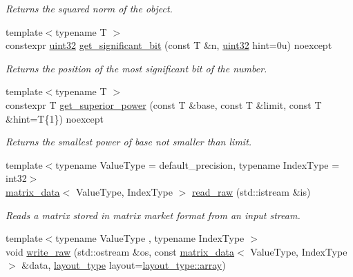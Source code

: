 \begin{DoxyCompactItemize}
\begin{DoxyCompactList}\small\item\em Returns the squared norm of the object. \end{DoxyCompactList}\item 
{\footnotesize template$<$typename T $>$ }\\constexpr \hyperlink{namespacegko_a318c831e3fe269ba04c6ed8bf5a71073}{uint32} \hyperlink{namespacegko_a4eea40e4123a3fdb60fcd92f902c6d6d}{get\+\_\+significant\+\_\+bit} (const T \&n, \hyperlink{namespacegko_a318c831e3fe269ba04c6ed8bf5a71073}{uint32} hint=0u) noexcept
\begin{DoxyCompactList}\small\item\em Returns the position of the most significant bit of the number. \end{DoxyCompactList}\item 
{\footnotesize template$<$typename T $>$ }\\constexpr T \hyperlink{namespacegko_ad39645fe8148a8a812a9528865a77600}{get\+\_\+superior\+\_\+power} (const T \&base, const T \&limit, const T \&hint=T\{1\}) noexcept
\begin{DoxyCompactList}\small\item\em Returns the smallest power of {\ttfamily base} not smaller than {\ttfamily limit}. \end{DoxyCompactList}\item 
{\footnotesize template$<$typename Value\+Type  = default\+\_\+precision, typename Index\+Type  = int32$>$ }\\\hyperlink{structgko_1_1matrix__data}{matrix\+\_\+data}$<$ Value\+Type, Index\+Type $>$ \hyperlink{namespacegko_a0b476e0e3df616b08efe85000bff8da0}{read\+\_\+raw} (std\+::istream \&is)
\begin{DoxyCompactList}\small\item\em Reads a matrix stored in matrix market format from an input stream. \end{DoxyCompactList}\item 
{\footnotesize template$<$typename Value\+Type , typename Index\+Type $>$ }\\void \hyperlink{namespacegko_ab31feb99c64fc6df58ac09abd4af69b6}{write\+\_\+raw} (std\+::ostream \&os, const \hyperlink{structgko_1_1matrix__data}{matrix\+\_\+data}$<$ Value\+Type, Index\+Type $>$ \&data, \hyperlink{namespacegko_ae749a5ea11a93c1bcc9158d9a6e9fb68}{layout\+\_\+type} layout=\hyperlink{namespacegko_ae749a5ea11a93c1bcc9158d9a6e9fb68af1f713c9e000f5d3f280adbd124df4f5}{layout\+\_\+type\+::array})

\end{DoxyCompactItemize}
